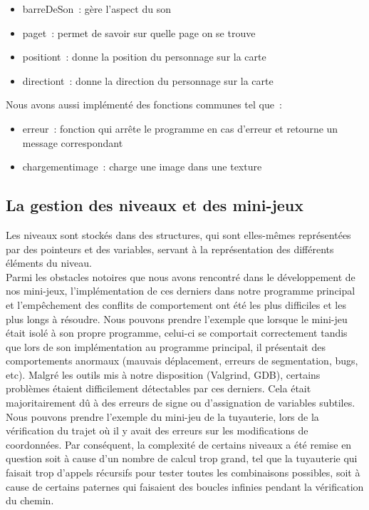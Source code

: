 \documentclass[12pt,a4paper]{article}
\begin{document}
            \begin{itemize}
                \item barreDeSon~: gère l’aspect du son
                \item page\textunderscore t~: permet de savoir sur quelle page on se trouve
                \item position\textunderscore t~: donne la position du personnage sur la carte
                \item direction\textunderscore t~: donne la direction du personnage sur la carte\\
            \end{itemize}

            Nous avons aussi implémenté des fonctions communes tel que~:\\
            
            \begin{itemize}
                \item erreur~: fonction qui arrête le programme en cas d’erreur et retourne un message correspondant
                \item chargement\textunderscore image~: charge une image dans une texture
            \end{itemize}

        \newpage
        
         \subsection{La gestion des niveaux et des mini-jeux}   
            \tabto{1cm} Les niveaux sont stockés dans des structures, qui sont elles-mêmes représentées par des pointeurs et des variables, servant à la représentation des différents éléments du niveau.\\

            \tabto{1cm} Parmi les obstacles notoires que nous avons rencontré dans le développement de nos mini-jeux, l’implémentation de ces derniers dans notre programme principal et l'empêchement des conflits de comportement ont été les plus difficiles et les plus longs à résoudre. Nous pouvons prendre l'exemple que lorsque le mini-jeu était isolé à son propre programme, celui-ci se comportait correctement tandis que lors de son implémentation au programme principal, il présentait des comportements anormaux (mauvais déplacement, erreurs de segmentation, bugs, etc). Malgré les outils mis à notre disposition (Valgrind, GDB), certains problèmes étaient difficilement détectables par ces derniers. Cela était majoritairement dû à des erreurs de signe ou d’assignation de variables subtiles. Nous pouvons prendre l'exemple du mini-jeu de la tuyauterie, lors de la vérification du trajet où il y avait des erreurs sur les modifications de coordonnées. Par conséquent, la complexité de certains niveaux a été remise en question soit à cause d’un nombre de calcul trop grand, tel que la tuyauterie qui faisait trop d’appels récursifs pour tester toutes les combinaisons possibles, soit à cause de certains paternes qui faisaient des boucles infinies pendant la vérification du chemin.
            
\end{document}
